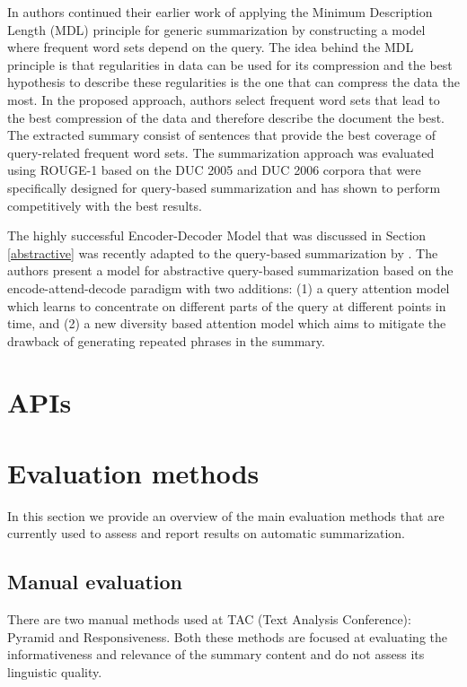 \documentclass[11pt,a4paper,onecolumn]{article}
\begin{document}
In \cite{litvak2017query} authors continued their earlier work \cite{litvak2015krimping} of applying the Minimum Description Length (MDL) principle for generic summarization by constructing a model where frequent word sets depend on the query.
The idea behind the MDL principle is that regularities in data can be used for its compression and the best hypothesis to describe these regularities is the one that can compress the data the most.
In the proposed approach, authors select frequent word sets that lead to the best compression of the data and therefore describe the document the best.
The extracted summary consist of sentences that provide the best coverage of query-related frequent word sets.
The summarization approach was evaluated using ROUGE-1 based on the DUC 2005 and DUC 2006 corpora that were specifically designed for query-based summarization and has shown to perform competitively with the best results.

The highly successful Encoder-Decoder Model that was discussed in Section \ref{abstractive} was recently adapted to the query-based summarization by \cite{nema2017diversity}.
The authors present a model for abstractive query-based summarization based on the encode-attend-decode paradigm with two additions: (1) a query attention model which learns to concentrate on different parts of the query at different points in time, and (2) a new diversity based attention model which aims to mitigate the drawback of generating repeated phrases in the summary.


\section{APIs}

\section{Evaluation methods}
In this section we provide an overview of the main evaluation methods that are currently used to assess and report results on automatic summarization.

\subsection{Manual evaluation}
There are two manual methods used at TAC (Text Analysis Conference): Pyramid and Responsiveness.
Both these methods are focused at evaluating the informativeness and relevance of the summary content and do not assess its linguistic quality.
\end{document}
